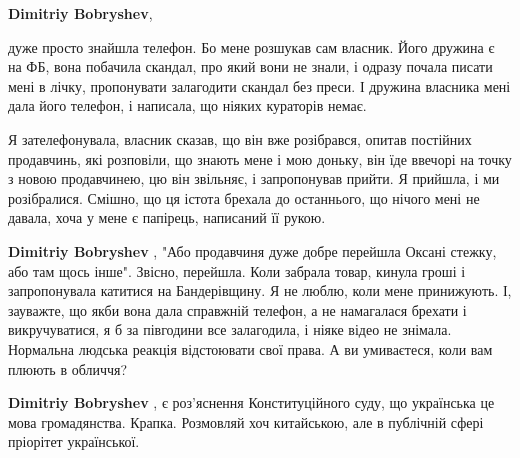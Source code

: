 \begin{itemize}
\begin{itemize}
 
\textbf{Dimitriy Bobryshev}, 

дуже просто знайшла телефон. Бо мене розшукав сам
власник. Його дружина є на ФБ, вона побачила скандал, про який вони не знали, і
одразу почала писати мені в лічку, пропонувати залагодити скандал без преси. І
дружина власника мені дала його телефон, і написала, що ніяких кураторів немає.

Я зателефонувала, власник сказав, що він вже розібрався, опитав постійних
продавчинь, які розповіли, що знають мене і мою доньку, він їде ввечорі на
точку з новою продавчинею, цю він звільняє, і запропонував прийти. Я прийшла, і
ми розібралися. Смішно, що ця істота брехала до останнього, що нічого мені не
давала, хоча у мене є папірець, написаний її рукою.

 
\textbf{Dimitriy Bobryshev} , "Або продавчиня дуже добре перейшла Оксані
стежку, або там щось інше". Звісно, перейшла. Коли забрала товар, кинула гроші
і запропонувала катитися на Бандерівщину. Я не люблю, коли мене принижують. І,
зауважте, що якби вона дала справжній телефон, а не намагалася брехати і
викручуватися, я б за півгодини все залагодила, і ніяке відео не знімала.
Нормальна людська реакція відстоювати свої права. А ви умиваєтеся, коли вам
плюють в обличчя?

 
\textbf{Dimitriy Bobryshev} , є роз'яснення Конституційного суду, що українська
це мова громадянства. Крапка. Розмовляй хоч китайською, але в публічній сфері
пріорітет української.

 

\end{itemize}
\end{itemize}
